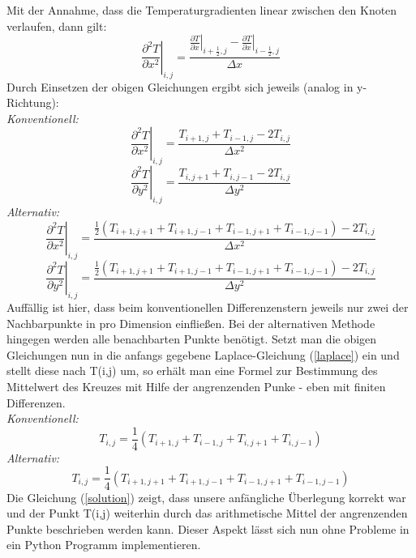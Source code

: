 \documentclass[twoside,10pt,a4paper]{article}
\numberwithin{equation}{section}					%
\numberwithin{figure}{section}						%
\begin{document}
Mit der Annahme, dass die Temperaturgradienten linear zwischen den Knoten verlaufen, dann gilt:
\begin{equation}
    \left.\frac{\partial^2 T}{\partial x^2}\right|_{i,j}=\frac{\left.\frac{\partial T}{\partial x}\right|_{i+\frac{1}{2},j}-\left.\frac{\partial T}{\partial x}\right|_{i-\frac{1}{2},j}}{\Delta x}
\end{equation}
Durch Einsetzen der obigen Gleichungen ergibt sich jeweils (analog in y-Richtung):\\
\textit{Konventionell:}\\
\begin{equation}
    \left.\frac{\partial^2 T}{\partial x^2}\right|_{i,j}=\frac{T_{i+1,j}+T_{i-1,j}-2T_{i,j}}{\Delta x^2}
\end{equation}
\begin{equation}
    \left.\frac{\partial^2 T}{\partial y^2}\right|_{i,j}=\frac{T_{i,j+1}+T_{i,j-1}-2T_{i,j}}{\Delta y^2}
\end{equation}
\textit{Alternativ:}\\
\begin{equation}
    \left.\frac{\partial^2 T}{\partial x^2}\right|_{i,j}=\frac{\frac{1}{2}(T_{i+1,j+1}+T_{i+1,j-1}+T_{i-1,j+1}+T_{i-1,j-1})-2T_{i,j}}{\Delta x^2}
\end{equation}
\begin{equation}
    \left.\frac{\partial^2 T}{\partial y^2}\right|_{i,j}=\frac{\frac{1}{2}(T_{i+1,j+1}+T_{i+1,j-1}+T_{i-1,j+1}+T_{i-1,j-1})-2T_{i,j}}{\Delta y^2}
\end{equation}
Auffällig ist hier, dass beim konventionellen Differenzenstern jeweils nur zwei der Nachbarpunkte in pro Dimension einfließen. Bei der alternativen Methode hingegen werden alle benachbarten Punkte benötigt.
Setzt man die obigen Gleichungen nun in die anfangs gegebene Laplace-Gleichung (\ref{laplace}) ein und stellt diese nach T(i,j) um, so erhält man eine Formel zur Bestimmung des Mittelwert des Kreuzes mit Hilfe der angrenzenden Punke - eben mit finiten Differenzen.\\
\textit{Konventionell:}\\
\begin{equation}
    T_{i,j}=\frac{1}{4}(T_{i+1,j}+T_{i-1,j}+T_{i,j+1}+T_{i,j-1})
\end{equation}
\textit{Alternativ:}\\
\begin{equation}\label{solution}
    T_{i,j}=\frac{1}{4}(T_{i+1,j+1}+T_{i+1,j-1}+T_{i-1,j+1}+T_{i-1,j-1})
\end{equation}
Die Gleichung (\ref{solution}) zeigt, dass unsere anfängliche Überlegung korrekt war und der Punkt T(i,j) weiterhin durch das arithmetische Mittel der angrenzenden Punkte beschrieben werden kann. Dieser Aspekt lässt sich nun ohne Probleme in ein Python Programm implementieren.
\end{document}
